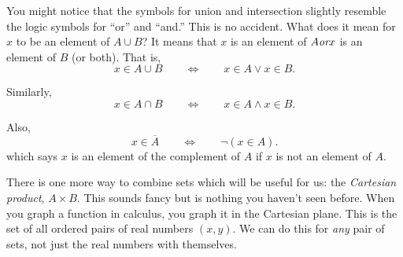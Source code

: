 \documentclass[10pt,]{book}
\theoremstyle{plain}
\theoremstyle{definition}
\theoremstyle{definition}
\theoremstyle{definition}
\numberwithin{equation}{section}
\def\Iff{\Leftrightarrow}
\def\bar{\overline}
\begin{document}
      You might notice that the symbols for union and intersection slightly resemble the logic symbols for ``or'' and ``and.'' This is no accident. What does it mean for \(x\) to be an element of \(A\cup B\)? It means that \(x\) is an element
      of \(A\emph{or}x\) is an element of \(B\) (or both). That is,
      \begin{equation*}
        x \in A \cup B \qquad \Iff \qquad x \in A \vee x \in B.
      \end{equation*}
\par

      Similarly,
      \begin{equation*}
        x \in A \cap B \qquad \Iff \qquad x \in A \wedge x \in B.
      \end{equation*}
\par

      Also,
      \begin{equation*}
        x \in \bar A \qquad \Iff \qquad \neg (x \in A).
      \end{equation*}
      which says \(x\) is an element of the complement of \(A\) if \(x\) is not an element of \(A\).
\par

      There is one more way to combine sets which will be useful for us: the \emph{Cartesian product}, \(A \times B\). This sounds fancy but is nothing you haven't seen before. When you graph a function in calculus, you graph it in the Cartesian
      plane. This is the set of all ordered pairs of real numbers \((x,y)\). We can do this for \emph{any} pair of sets, not just the real numbers with themselves.
\par
\end{document}
